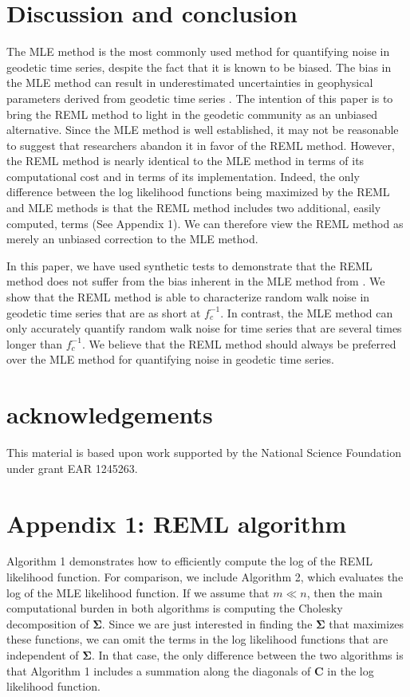 \section{Discussion and conclusion}\label{sec:conclusion}
The MLE method is the most commonly used method for quantifying noise in geodetic time series, despite the fact that it is known to be biased. The bias in the MLE method can result in underestimated uncertainties in geophysical parameters derived from geodetic time series \citep{Langbein2012}. The intention of this paper is to bring the REML method to light in the geodetic community as an unbiased alternative. Since the MLE method is well established, it may not be reasonable to suggest that researchers abandon it in favor of the REML method.  However, the REML method is nearly identical to the MLE method in terms of its computational cost and in terms of its implementation. Indeed, the only difference between the log likelihood functions being maximized by the REML and MLE methods is that the REML method includes two additional, easily computed, terms (See Appendix 1). We can therefore view the REML method as merely an unbiased correction to the MLE method.     

In this paper, we have used synthetic tests to demonstrate that the REML method does not suffer from the bias inherent in the MLE method from \citet{Langbein1997}. We show that the REML method is able to characterize random walk noise in geodetic time series that are as short at $f_c^{-1}$. In contrast, the MLE method can only accurately quantify random walk noise for time series that are several times longer than $f_c^{-1}$. We believe that the REML method should always be preferred over the MLE method for quantifying noise in geodetic time series. 

\section{acknowledgements}
This material is based upon work supported by the National Science Foundation under grant EAR 1245263.

\section*{Appendix 1: REML algorithm}

Algorithm 1 demonstrates how to efficiently compute the log of the REML likelihood function. For comparison, we include Algorithm 2, which evaluates the log of the MLE likelihood function. If we assume that $m \ll n$, then the main computational burden in both algorithms is computing the Cholesky decomposition of $\mathbf{\Sigma}$. Since we are just interested in finding the $\mathbf{\Sigma}$ that maximizes these functions, we can omit the terms in the log likelihood functions that are independent of $\mathbf{\Sigma}$. In that case, the only difference between the two algorithms is that Algorithm 1 includes a summation along the diagonals of $\mathbf{C}$ in the log likelihood function.    



